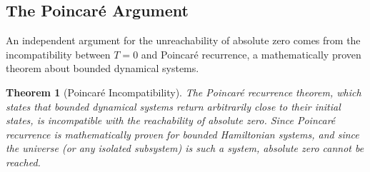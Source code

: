 \documentclass[12pt,a4paper]{article}
\newtheorem{theorem}{Theorem}[section]
\theoremstyle{definition}
\theoremstyle{remark}
\begin{document}
\subsection{The Poincaré Argument}

An independent argument for the unreachability of absolute zero comes from the incompatibility between $T = 0$ and Poincaré recurrence, a mathematically proven theorem about bounded dynamical systems.

\begin{theorem}[Poincaré Incompatibility]
\label{thm:poincare_incompatibility}
The Poincaré recurrence theorem, which states that bounded dynamical systems return arbitrarily close to their initial states, is incompatible with the reachability of absolute zero. Since Poincaré recurrence is mathematically proven for bounded Hamiltonian systems, and since the universe (or any isolated subsystem) is such a system, absolute zero cannot be reached.
\end{theorem}
\end{document}
